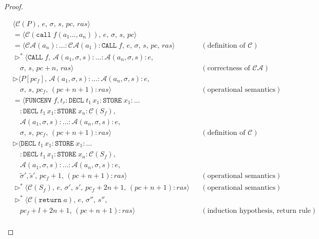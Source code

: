 \documentclass{article}
\begin{document}
\begin{proof}
\begin{itemize}
\[
  \begin{aligned}
  &\langle \mathcal{C}(P),\, e,\, \sigma,\, s,\, pc,\, ras \rangle \\
  &= \langle \mathcal{C}(\texttt{call}\; f(a_1 \dots, a_n)),\, e,\, \sigma,\, s,\, pc \rangle \\
  &= \langle \mathcal{CA}(a_n) : \dots : \mathcal{CA}(a_1) : \texttt{CALL}\; f,\, e,\, \sigma,\, s,\, pc,\, ras \rangle
  && (\text{definition of } \mathcal{C})   \\
  &\triangleright^\ast \langle  \texttt{CALL}\; f,\, \mathcal{A}(a_1, \sigma, s) : \dots : \mathcal{A}(a_n, \sigma, s) : e,\, \\
  &\quad \sigma,\, s,\, pc+n,\, ras \rangle
  && (\text{correctness of } \mathcal{CA})   \\
  &\triangleright \langle  P[pc_f],\, \mathcal{A}(a_1, \sigma, s) : \dots : \mathcal{A}(a_n, \sigma, s) : e,\, \\
  &\quad \sigma,\, s,\, pc_f,\, (pc+n+1) : ras \rangle
  && (\text{operational semantics}) \\
  &= \langle  \texttt{FUNCENV}\; f, t_r : \texttt{DECL}\;t_1\,x_1 : \texttt{STORE}\; x_1 :  \dots \\
  &\quad : \texttt{DECL}\;t_1\,x_1 : \texttt{STORE}\; x_n : \mathcal{C}(S_f),\, \\
  &\quad \mathcal{A}(a_1, \sigma, s) : \dots : \mathcal{A}(a_n, \sigma, s) : e,\, \\
  &\quad \sigma,\, s,\, pc_f,\, (pc+n+1) : ras \rangle
  && (\text{definition of } \mathcal{C})   \\
  &\triangleright \langle  \texttt{DECL}\;t_1\,x_1 : \texttt{STORE}\; x_1 :  \dots \\
  &\quad : \texttt{DECL}\;t_1\,x_1 : \texttt{STORE}\; x_n : \mathcal{C}(S_f),\, \\
  &\quad \mathcal{A}(a_1, \sigma, s) : \dots : \mathcal{A}(a_n, \sigma, s) : e,\, \\
  &\quad \tilde{\sigma}', \tilde{s}',\, pc_f + 1,\, (pc+n+1) : ras \rangle
  && (\text{operational semantics})   \\
  &\triangleright^\ast \langle \mathcal{C}(S_f),\, e,\, \sigma',\, s',\, pc_f + 2n+1,\, (pc+n+1) : ras \rangle
  && (\text{operational semantics})   \\
  &\triangleright^\ast \langle \mathcal{C}(\texttt{return}\; a),\, e,\, \sigma'',\, s'',\, \\
  &\quad pc_f + l + 2n+1,\, (pc+n+1) : ras \rangle
  && (\text{induction hypothesis},\, \text{return rule})   \\

\end{aligned}\]
\end{itemize}
\end{proof}
\end{document}
